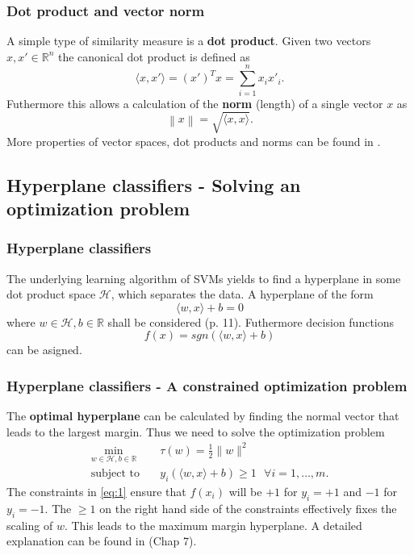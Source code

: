 \documentclass{beamer}
\begin{document}
\begin{frame}{}
    \frametitle{Dot product and vector norm}
    A simple type of similarity measure is a \textbf{dot product}. Given two vectors $x, x' \in \mathbb{R}^n$ the canonical dot product is defined as
    \begin{equation}
        \langle x,x' \rangle = (x')^T x = \sum_{i = 1}^{n} x_i x'_i.
    \end{equation}
    Futhermore this allows a calculation of the \textbf{norm} (length) of a single vector $x$ as 
    \begin{equation}
        \left\lVert x \right\rVert = \sqrt{\langle x,x \rangle}.
    \end{equation}
    More properties of vector spaces, dot products and norms can be found in \cite{Liesen}.
\end{frame}


\subsection{Hyperplane classifiers - Solving an optimization problem}

\begin{frame}{}
    \frametitle{Hyperplane classifiers}
    The underlying learning algorithm of SVMs yields to find a hyperplane in some dot product space $\mathcal{H}$, which separates the data. A hyperplane of the form
    \begin{equation}
        \langle w,x \rangle + b = 0
    \end{equation}
    where $w \in \mathcal{H}, b \in \mathbb{R}$ shall be considered \cite{Schoelkopf}(p. 11). Futhermore decision functions 
    \begin{equation}
        f(x) = sgn \left( \langle w,x \rangle + b \right)
    \end{equation}
    can be asigned.
\end{frame}


\begin{frame}{}
    \frametitle{Hyperplane classifiers - A constrained optimization problem}
    The \textbf{optimal hyperplane} can be calculated by finding the normal vector that leads to the largest margin. Thus we need to solve the optimization problem
    \begin{equation} \label{eq:1}
        \begin{aligned}
            \min_{w \in \mathcal{H}, b \in \mathbb{R}} \quad & \tau (w) = \frac{1}{2} \lVert w \rVert^2 \\
            \textrm{subject to} \quad & y_{i} \left( \langle w,x \rangle + b \right) \geq 1 \text{ } \forall i = {1, \dots, m}. 
        \end{aligned}
    \end{equation}
    The constraints in \eqref{eq:1} ensure that $f(x_i)$ will be $+1$ for $y_i = +1$ and $-1$ for  $y_i = -1$. The $\geq 1$ on the right hand side of the constraints effectively fixes the scaling of $w$. This leads to the maximum margin hyperplane. A detailed explanation can be found in \cite{Schoelkopf}(Chap 7).
\end{frame}
\end{document}
